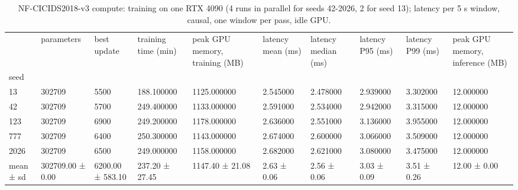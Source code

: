 \begin{table}
\caption{NF-CICIDS2018-v3 compute: training on one RTX 4090 (4 runs in parallel for seeds 42-2026, 2 for seed 13); latency per 5 s window, causal, one window per pass, idle GPU.}
\label{tab:table4_compute}
\begin{tabular}{llllllllll}
\toprule
 & parameters & best update & training time (min) & peak GPU memory, training (MB) & latency mean (ms) & latency median (ms) & latency P95 (ms) & latency P99 (ms) & peak GPU memory, inference (MB) \\
seed &  &  &  &  &  &  &  &  &  \\
\midrule
13 & 302709 & 5500 & 188.100000 & 1125.000000 & 2.545000 & 2.478000 & 2.939000 & 3.302000 & 12.000000 \\
42 & 302709 & 5700 & 249.400000 & 1133.000000 & 2.591000 & 2.534000 & 2.942000 & 3.315000 & 12.000000 \\
123 & 302709 & 6900 & 249.200000 & 1178.000000 & 2.636000 & 2.551000 & 3.136000 & 3.955000 & 12.000000 \\
777 & 302709 & 6400 & 250.300000 & 1143.000000 & 2.674000 & 2.600000 & 3.066000 & 3.509000 & 12.000000 \\
2026 & 302709 & 6500 & 249.000000 & 1158.000000 & 2.682000 & 2.621000 & 3.080000 & 3.475000 & 12.000000 \\
mean ± sd & 302709.00 ± 0.00 & 6200.00 ± 583.10 & 237.20 ± 27.45 & 1147.40 ± 21.08 & 2.63 ± 0.06 & 2.56 ± 0.06 & 3.03 ± 0.09 & 3.51 ± 0.26 & 12.00 ± 0.00 \\
\bottomrule
\end{tabular}
\end{table}
